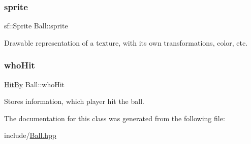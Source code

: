\mbox{\label{class_ball_a16017a7b3ea4c4005046eedecb3fe774}} 
\subsubsection{\texorpdfstring{sprite}{sprite}}
{\footnotesize\ttfamily sf\+::\+Sprite Ball\+::sprite\hspace{0.3cm}{\ttfamily [private]}}



Drawable representation of a texture, with its own transformations, color, etc. 

\mbox{\label{class_ball_aad64a181e6e7c8e028dddde82403c9e5}} 
\subsubsection{\texorpdfstring{whoHit}{whoHit}}
{\footnotesize\ttfamily \mbox{\hyperlink{_ball_8hpp_ae19cd4d7bfabe0d8dc59e64076cadc00}{Hit\+By}} Ball\+::who\+Hit}



Stores information, which player hit the ball. 



The documentation for this class was generated from the following file\+:\begin{DoxyCompactItemize}
\item 
include/\mbox{\hyperlink{_ball_8hpp}{Ball.\+hpp}}\end{DoxyCompactItemize}
